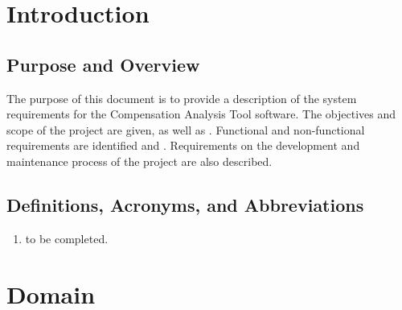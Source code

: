 \documentclass[english]{article}
\begin{document}
\vspace*{\fill}
{
\vspace*{\fill}

\newpage

\tableofcontents

\newpage

\setcounter{page}{1}
}


\color{black}
\section{Introduction}
\label{sec:introduction}

\subsection{Purpose and Overview}
\label{sub:purpose}
The purpose of this document is to provide a description of the system requirements for the Compensation Analysis Tool software.  The objectives and scope of the project are given, as well as .  Functional and non-functional requirements are identified and .  Requirements on the development and maintenance process of the project are also described.


\subsection{Definitions, Acronyms, and Abbreviations}
\label{sub:definitions_acronyms_and_abbreviations}
\begin{enumerate}
	\item to be completed.
\end{enumerate}

\section{Domain}
\label{sec:overall_description}
\end{document}
